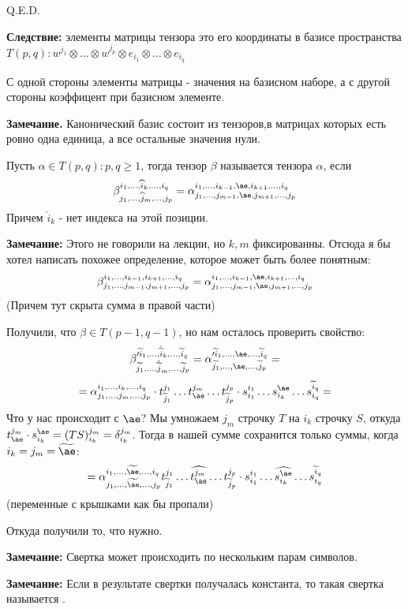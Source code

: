\hfill Q.E.D.

\textbf{Следствие:} элементы матрицы тензора это его координаты в базисе пространства $T(p,q): w^{j_1}\otimes \ldots\otimes w^{j_p}\otimes e_{i_1}\otimes \ldots \otimes e_{i_q}$

С одной стороны элементы матрицы - значения на базисном наборе, а с другой стороны коэффицент при базисном элементе.


\textbf{Замечание.} Канонический базис состоит из тензоров,в матрицах которых есть ровно одна единица, а все остальные значения нули.

 Пусть $\alpha \in T(p,q): p,q \geq 1$, тогда тензор $\beta$ называется  тензора $\alpha$, если
$$\beta^{i_1,\ldots, \widehat{i}_k,\ldots,i_q}_{j_1,\ldots,\widehat{j}_m,\ldots,j_p} = \alpha_{j_1,\ldots,j_{m-1}, \ae,j_{m+1},\ldots,j_p}^{i_1,\ldots,i_{k-1},\ae, i_{k+1},\ldots,i_q}$$
Причем $\widehat{i}_k$ - нет индекса на этой позиции.

\textbf{Замечание:} Этого не говорили на лекции, но $k,m$ фиксированны. Отсюда я бы хотел написать похожее определение, которое может быть более понятным:
$$\beta_{j_1,\ldots,j_{m-1},j_{m+1},\ldots,j_p}^{i_1,\ldots,i_{k-1},i_{k+1},\ldots,i_q} = \alpha_{j_1,\ldots,j_{m-1}, \ae,j_{m+1},\ldots,j_p}^{i_1,\ldots,i_{k-1},\ae, i_{k+1},\ldots,i_q}$$
(Причем тут скрыта сумма в правой части)

Получили, что $\beta \in T(p-1,q-1)$, но нам осталось проверить свойство:
$$\beta_{\widetilde{j_1},\ldots,\hat{\widetilde{j}}_m,\ldots,\widetilde{j}_p}'^{\widetilde{i}_1,\ldots,\hat{\widetilde{i}}_k,\ldots, \widetilde{i}_q} =\alpha_{\widetilde{j_1},\ldots,\ae,\ldots,\widetilde{j}_p}'^{\widetilde{i}_1,\ldots,\ae,\ldots, \widetilde{i}_q} = $$
$$= \alpha_{j_1,\ldots,j_m,\ldots,j_p}^{i_1,\ldots,i_k,\ldots,i_q} \cdot t_{\widetilde{j}_1}^{j_1}\ldots t^{j_m}_{\ae}\ldots t^{j_p}_{\widetilde{j}_p}\cdot s_{i_1}^{i_1}\ldots s^{\ae}_{i_k}\ldots s_{i_q}^{\widetilde{i}_q} = $$
Что у нас происходит с $\ae$? Мы умножаем $j_m$ строчку $T$ на $i_k$ строчку $S$, откуда $t^{j_m}_{\ae} \cdot s_{i_k}^{\ae} = (TS)_{i_k}^{j_m} =\delta_{i_k}^{j_m}$. Тогда в нашей сумме сохранится только суммы, когда $i_k = j_m = \widetilde{\ae} $:
$$=\alpha_{j_1,\ldots,\widetilde{\ae},\ldots,j_p}^{i_1,\ldots, \widetilde{\ae},\ldots, i_q}t_{\widetilde{j}_1}^{j_1}\ldots \widehat{t^{j_m}_{\ae}}\ldots t^{j_p}_{\widetilde{j}_p}\cdot s_{i_1}^{i_1}\ldots \widehat{s^{\ae}_{i_k}}\ldots s_{i_q}^{\widetilde{i}_q}$$
(переменные с крышками как бы пропали)

Откуда получили то, что нужно.

\textbf{Замечание:} Свертка может происходить по нескольким парам символов.

\textbf{Замечание:} Если в результате свертки получалась константа, то такая свертка называется .

